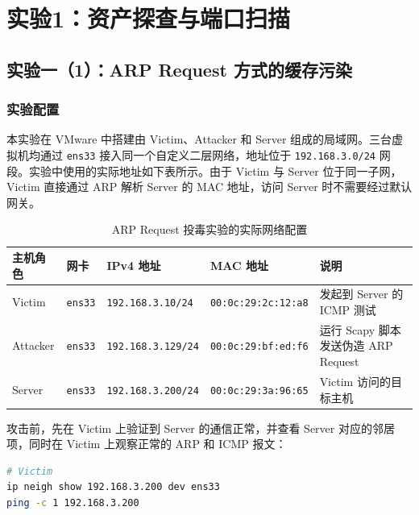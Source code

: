 \section{ 实验1：资产探查与端口扫描}

\subsection{实验一（1）：ARP Request 方式的缓存污染}

\subsubsection{实验配置}

本实验在 VMware 中搭建由 Victim、Attacker 和 Server 组成的局域网。三台虚拟机均通过 \texttt{ens33} 接入同一个自定义二层网络，地址位于 \texttt{192.168.3.0/24} 网段。实验中使用的实际地址如下表所示。由于 Victim 与 Server 位于同一子网，Victim 直接通过 ARP 解析 Server 的 MAC 地址，访问 Server 时不需要经过默认网关。

\begin{table}[H]
    \centering
    \caption{ARP Request 投毒实验的实际网络配置}
    \label{tab:task1-network}
    \renewcommand{\arraystretch}{1.25}
    \begin{tabularx}{\linewidth}{l l l l X}
        \toprule
        主机角色 & 网卡 & IPv4 地址 & MAC 地址 & 说明 \\
        \midrule
        Victim & \texttt{ens33} & \texttt{192.168.3.10/24} & \texttt{00:0c:29:2c:12:a8} & 发起到 Server 的 ICMP 测试 \\
        Attacker & \texttt{ens33} & \texttt{192.168.3.129/24} & \texttt{00:0c:29:bf:ed:f6} & 运行 Scapy 脚本发送伪造 ARP Request \\
        Server & \texttt{ens33} & \texttt{192.168.3.200/24} & \texttt{00:0c:29:3a:96:65} & Victim 访问的目标主机 \\
        \bottomrule
    \end{tabularx}
\end{table}

攻击前，先在 Victim 上验证到 Server 的通信正常，并查看 Server 对应的邻居项，同时在 Victim 上观察正常的 ARP 和 ICMP 报文：

\begin{lstlisting}[language=bash,caption={攻击前 Victim 的通信检查命令}]
# Victim
ip neigh show 192.168.3.200 dev ens33
ping -c 1 192.168.3.200

\end{lstlisting}

